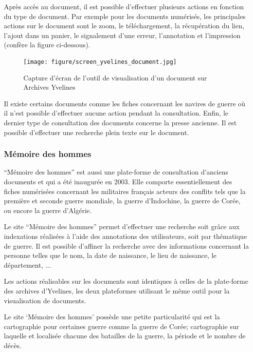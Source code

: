         Après accès au document, il est possible d’effectuer plusieurs actions  en fonction du type de document. Par exemple pour les documents numérisés, les principales actions sur le document sont le zoom, le téléchargement, la récupération du lien, l’ajout dans un panier, le signalement d’une erreur, l’annotation et l’impression (confère la figure ci-dessous).

        \begin{figure}[ht!]
            \centering
            \texttt{[image: figure/screen\_yvelines\_document.jpg]}
            \caption{Capture d'écran de l'outil de visualisation d'un document sur Archives Yvelines}
            \label{fig:gallica}
        \end{figure}

        Il existe certains documents comme les fiches concernant les navires de guerre où il n’est possible d’effectuer aucune action pendant la consultation. Enfin, le dernier type de consultation des documents concerne la presse ancienne. Il est possible d’effectuer une recherche plein texte sur le document.

        \subsubsection{Mémoire des hommes}
        \label{subsubsec:memoire}
        “Mémoire des hommes” est aussi une plate-forme de consultation d’anciens documents et qui a été inaugurée en 2003. Elle comporte essentiellement des fiches numérisées concernant les militaires français acteurs des conflits tels que la première et seconde guerre mondiale, la guerre d’Indochine, la guerre de Corée, ou encore la guerre d’Algérie. 

        Le site “Mémoire des hommes” permet d’effectuer une recherche soit grâce aux indexations réalisées à l’aide des annotations des utilisateurs, soit par thématique de guerre. Il est possible d’affiner la recherche avec des informations concernant la personne telles que le nom, la date de naissance, le lieu de naissance, le département, ...

        Les actions réalisables sur les documents sont identiques à celles de la plate-forme des archives d’Yvelines, les deux plateformes utilisant le même outil pour la visualisation de documents.

        Le site ‘Mémoire des hommes’ possède une petite particularité qui est la cartographie pour certaines guerre comme la guerre de Corée;  cartographie sur laquelle et localisée chacune des batailles de la guerre, la période et le nombre de décès.

